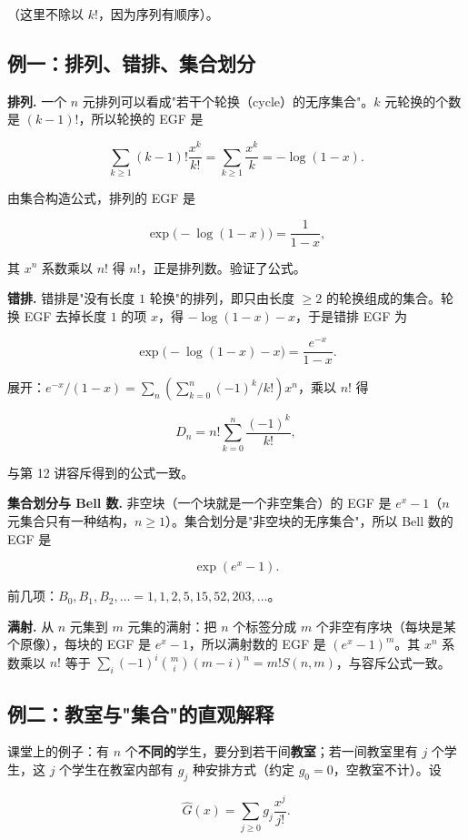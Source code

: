 （这里不除以 $k!$，因为序列有顺序）。

\subsection{例一：排列、错排、集合划分}


\textbf{排列.} 一个 $n$ 元排列可以看成"若干个轮换（cycle）的无序集合"。$k$ 元轮换的个数是 $(k-1)!$，所以轮换的 EGF 是

\[
\sum_{k\ge1}(k-1)!\frac{x^k}{k!}=\sum_{k\ge1}\frac{x^k}{k}=-\log(1-x).
\]

由集合构造公式，排列的 EGF 是

\[
\exp\bigl(-\log(1-x)\bigr)=\frac{1}{1-x},
\]

其 $x^n$ 系数乘以 $n!$ 得 $n!$，正是排列数。验证了公式。

\textbf{错排.} 错排是"没有长度 $1$ 轮换"的排列，即只由长度 $\ge2$ 的轮换组成的集合。轮换 EGF 去掉长度 $1$ 的项 $x$，得 $-\log(1-x)-x$，于是错排 EGF 为

\[
\exp\bigl(-\log(1-x)-x\bigr)=\frac{e^{-x}}{1-x}.
\]

展开：$e^{-x}/(1-x)=\sum_n\left(\sum_{k=0}^n(-1)^k/k!\right)x^n$，乘以 $n!$ 得

\[
D_n=n!\sum_{k=0}^{n}\frac{(-1)^k}{k!},
\]

与第 12 讲容斥得到的公式一致。

\textbf{集合划分与 Bell 数.} 非空块（一个块就是一个非空集合）的 EGF 是 $e^x-1$（$n$ 元集合只有一种结构，$n\ge1$）。集合划分是"非空块的无序集合"，所以 Bell 数的 EGF 是

\[
\exp(e^x-1).
\]

前几项：$B_0,B_1,B_2,\dots=1,1,2,5,15,52,203,\dots$。

\textbf{满射.} 从 $n$ 元集到 $m$ 元集的满射：把 $n$ 个标签分成 $m$ 个非空有序块（每块是某个原像），每块的 EGF 是 $e^x-1$，所以满射数的 EGF 是 $(e^x-1)^m$。其 $x^n$ 系数乘以 $n!$ 等于 $\sum_i(-1)^i\binom mi(m-i)^n=m!S(n,m)$，与容斥公式一致。

\subsection{例二：教室与"集合"的直观解释}


课堂上的例子：有 $n$ 个\textbf{不同的}学生，要分到若干间\textbf{教室}；若一间教室里有 $j$ 个学生，这 $j$ 个学生在教室内部有 $g_j$ 种安排方式（约定 $g_0=0$，空教室不计）。设

\[
\hat G(x)=\sum_{j\ge0}g_j\frac{x^j}{j!}.
\]

